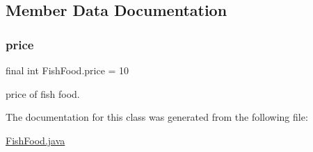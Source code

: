 \subsection{Member Data Documentation}
\mbox{\label{class_fish_food_a3b3d22ebf237fb5fb445e1d8b233a777}} 
\subsubsection{\texorpdfstring{price}{price}}
{\footnotesize\ttfamily final int Fish\+Food.\+price = 10\hspace{0.3cm}{\ttfamily [static]}}

price of fish food. 

The documentation for this class was generated from the following file\+:\begin{DoxyCompactItemize}
\item 
\mbox{\hyperlink{_fish_food_8java}{Fish\+Food.\+java}}\end{DoxyCompactItemize}
